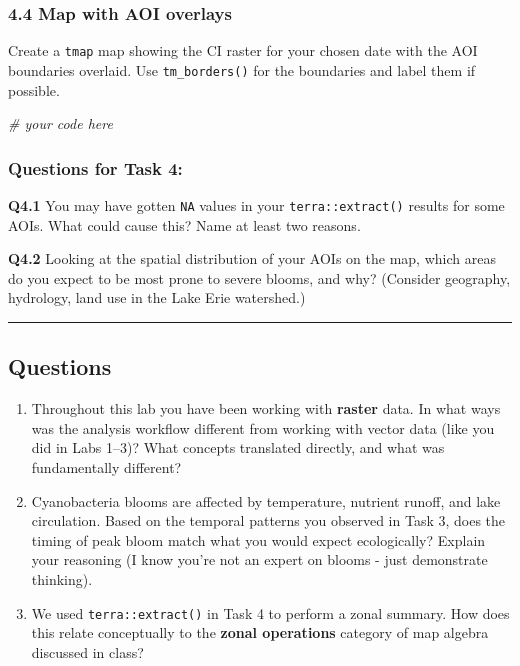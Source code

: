 \documentclass[
]{article}
\newenvironment{Shaded}{\begin{snugshade}}{\end{snugshade}}
\newcommand{\CommentTok}[1]{\textcolor[rgb]{0.56,0.35,0.01}{\textit{#1}}}
\begin{document}
\subsubsection{4.4 Map with AOI overlays}\label{map-with-aoi-overlays}

Create a \texttt{tmap} map showing the CI raster for your chosen date
with the AOI boundaries overlaid. Use \texttt{tm\_borders()} for the
boundaries and label them if possible.

\begin{Shaded}
\begin{Highlighting}[]
\CommentTok{\# your code here}
\end{Highlighting}
\end{Shaded}

\subsubsection{Questions for Task 4:}\label{questions-for-task-4}

\textbf{Q4.1} You may have gotten \texttt{NA} values in your
\texttt{terra::extract()} results for some AOIs. What could cause this?
Name at least two reasons.

\textbf{Q4.2} Looking at the spatial distribution of your AOIs on the
map, which areas do you expect to be most prone to severe blooms, and
why? (Consider geography, hydrology, land use in the Lake Erie
watershed.)

\begin{center}\rule{0.5\linewidth}{0.5pt}\end{center}

\subsection{Questions}\label{questions}

\begin{enumerate}
\def\labelenumi{\arabic{enumi}.}
\item
  Throughout this lab you have been working with \textbf{raster} data.
  In what ways was the analysis workflow different from working with
  vector data (like you did in Labs 1--3)? What concepts translated
  directly, and what was fundamentally different?
\item
  Cyanobacteria blooms are affected by temperature, nutrient runoff, and
  lake circulation. Based on the temporal patterns you observed in Task
  3, does the timing of peak bloom match what you would expect
  ecologically? Explain your reasoning (I know you're not an expert on
  blooms - just demonstrate thinking).
\item
  We used \texttt{terra::extract()} in Task 4 to perform a zonal
  summary. How does this relate conceptually to the \textbf{zonal
  operations} category of map algebra discussed in class?
\end{enumerate}
\end{document}
